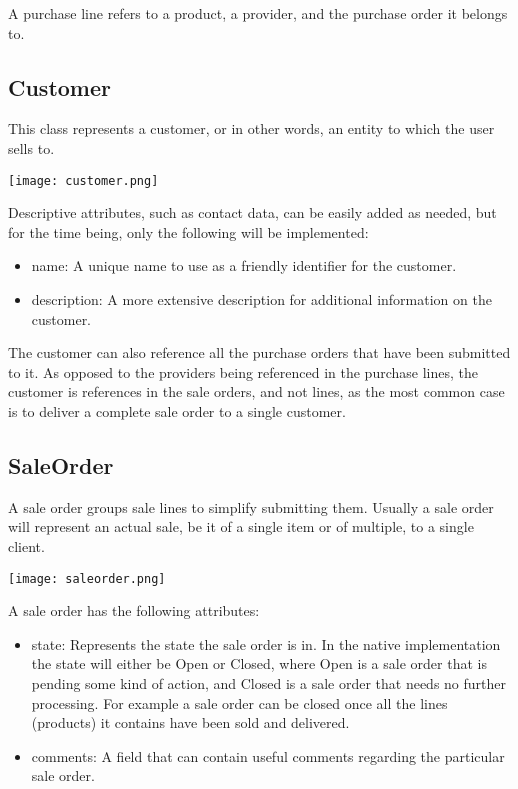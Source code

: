 A purchase line refers to a product, a provider, and the purchase order it belongs to.

\subsection{Customer}
This class represents a customer, or in other words, an entity to which the user sells to. 
\begin{center}
\texttt{[image: customer.png]}
\end{center}
Descriptive attributes, such as contact data, can be easily added as needed, but for the time being, only the following will be implemented:

\begin{itemize}
\item name: A unique name to use as a friendly identifier for the customer.
\item description: A more extensive description for additional information on the customer.
\end{itemize}

The customer can also reference all the purchase orders that have been submitted to it. As opposed to the providers being referenced in the purchase lines, the customer is references in the sale orders, and not lines, as the most common case is to deliver a complete sale order to a single customer.

\subsection{SaleOrder}
A sale order groups sale lines to simplify submitting them. Usually a sale order will represent an actual sale, be it of a single item or of multiple, to a single client.
\begin{center}
\texttt{[image: saleorder.png]}
\end{center}
A sale order has the following attributes:

\begin{itemize}
\item state: Represents the state the sale order is in. In the native implementation the state will either be Open or Closed, where Open is a sale order that is pending some kind of action, and Closed is a sale order that needs no further processing. For example a sale order can be closed once all the lines (products) it contains have been sold and delivered.
\item comments: A field that can contain useful comments regarding the particular sale order.
\end{itemize}

